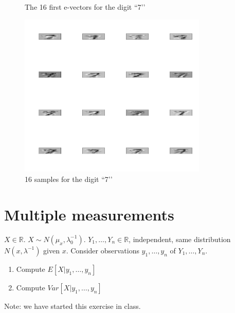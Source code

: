 \documentclass{article}[12pt]
\begin{document}
\begin{enumerate}
\begin{figure}
\caption{\label{fig:e-vectors}The 16 first e-vectors for the digit ``7\rq\rq{}}
\end{figure}
\begin{figure}
\includegraphics[width=0.8\textwidth]{samples-of-7.pdf}
\caption{\label{fig:samples}16 samples for the digit ``7\rq\rq{}}
\end{figure}
\end{enumerate}
\section{Multiple measurements}
$X \in \mathbb{R}$. $X \sim N(\mu_x,\lambda_0^{-1})$. $Y_1,\ldots,Y_n \in \mathbb{R}$, independent, same distribution $N(x,\lambda^{-1})$ given $x$. Consider observations $y_1,\ldots,y_n$ of $Y_1,\ldots,Y_n$.   
\begin{enumerate}
\item Compute $E[X|y_1,\ldots,y_n]$
\item Compute $Var[X|y_1,\ldots,y_n]$
\end{enumerate}
Note: we have started this exercise in class.
\end{document}
